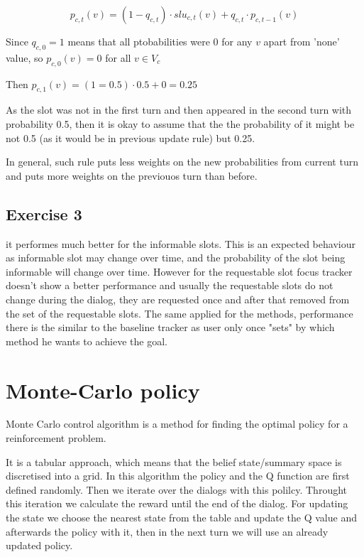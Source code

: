 \documentclass[12pt,titlepage,a4paper]{article}
\begin{document}
\begin{equation}
    p_{c,t}(v) = (1-q_{c,t})\cdot slu_{c,t}(v) + q_{c,t} \cdot p_{c,t-1}(v)
\end{equation}

Since $q_{c,0}=1$ means that all ptobabilities were 0 for any $v$ apart from 'none' value, so $p_{c,0}(v) = 0$ for all $v \in V_c$

Then $p_{c,1}(v) = (1 = 0.5) \cdot 0.5 + 0 = 0.25$

As the slot was not in the first turn and then appeared in the second turn with probability 0.5, then it is okay to assume that the the probability of it might be not 0.5 (as it would be in previous update rule) but 0.25.

In general, such rule puts less weights on the new probabilities from current turn and puts more weights on the previouos turn than before. 

\subsection{Exercise 3}
it performes much better for the informable slots. This is an expected behaviour as informable slot may change over time, and the probability of the slot being informable will change over time. However for the requestable slot focus tracker doesn't show a better performance and usually the requestable slots do not change during the dialog, they are requested once and after that removed from the set of the requestable slots. The same applied for the methods, performance there is the similar to the baseline tracker as user only once "sets" by which method he wants to achieve the goal.
\section{Monte-Carlo policy}

Monte Carlo control algorithm is a method for finding the optimal policy for a reinforcement problem.

It is a tabular approach, which means that the belief state/summary space is discretised into a grid. In this algorithm the policy and the Q function are first defined randomly. Then we iterate over the dialogs with this polilcy. Throught this iteration we calculate the reward until the end of the dialog. For updating the state we choose the nearest state from the table and update the Q value and afterwards the policy with it, then in the next turn we will use an already updated policy. 
\end{document}
